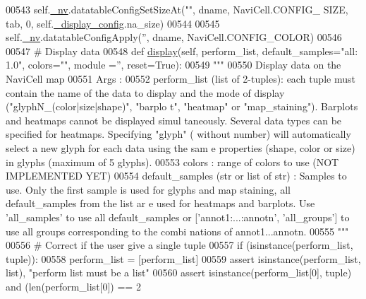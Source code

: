 \begin{DoxyCode}
00543                     self.\hyperlink{classnavicom_1_1navicom_1_1NaviCom_afff3fd56fa16a68bab52ba8d801e325a}{_nv}.datatableConfigSetSizeAt(\textcolor{stringliteral}{""}, dname, NaviCell.CONFIG\_
      SIZE, tab, 0, self.\hyperlink{classnavicom_1_1navicom_1_1NaviCom_ab8ddca454f674629472d8bfec46ac76f}{_display_config}.na\_size)
00544 
00545             self.\hyperlink{classnavicom_1_1navicom_1_1NaviCom_afff3fd56fa16a68bab52ba8d801e325a}{_nv}.datatableConfigApply(\textcolor{stringliteral}{''}, dname, NaviCell.CONFIG\_COLOR)
00546         
00547     \textcolor{comment}{# Display data}
00548     \textcolor{keyword}{def }\hyperlink{classnavicom_1_1navicom_1_1NaviCom_ad7d4390d700d4a6d2533647887f8ab94}{display}(self, perform\_list, default\_samples="all: 1.0\textcolor{stringliteral}{", colors="}\textcolor{stringliteral}{", module
      ='', reset=True):}
00549 \textcolor{stringliteral}{        }\textcolor{stringliteral}{"""}
00550 \textcolor{stringliteral}{        Display data on the NaviCell map}
00551 \textcolor{stringliteral}{        Args :}
00552 \textcolor{stringliteral}{            perform\_list (list of 2-tuples): each tuple must contain the name of 
      the data to display and the mode of display ("glyphN\_(color|size|shape)", "barplo
      t", "heatmap" or "map\_staining"). Barplots and heatmaps cannot be displayed simul
      taneously. Several data types can be specified for heatmaps. Specifying "glyph" (
      without number) will automatically select a new glyph for each data using the sam
      e properties (shape, color or size) in glyphs (maximum of 5 glyphs).}
00553 \textcolor{stringliteral}{            colors : range of colors to use (NOT IMPLEMENTED YET)}
00554 \textcolor{stringliteral}{            default\_samples (str or list of str) : Samples to use. Only the first
       sample is used for glyphs and map staining, all default\_samples from the list ar
      e used for heatmaps and barplots. Use 'all\_samples' to use all default\_samples or
       ['annot1:...:annotn', 'all\_groups'] to use all groups corresponding to the combi
      nations of annot1...annotn.}
00555 \textcolor{stringliteral}{        """}
00556         \textcolor{comment}{# Correct if the user give a single tuple}
00557         \textcolor{keywordflow}{if} (isinstance(perform\_list, tuple)):
00558             perform\_list = [perform\_list]
00559         \textcolor{keyword}{assert} isinstance(perform\_list, list), \textcolor{stringliteral}{"perform list must be a list"}
00560         \textcolor{keyword}{assert} isinstance(perform\_list[0], tuple) \textcolor{keywordflow}{and} (len(perform\_list[0]) == 2 

\end{DoxyCode}
